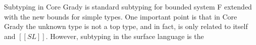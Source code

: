 Subtyping in Core Grady is standard subtyping for bounded system F
extended with the new bounds for simple types.  One important point is
that in Core Grady the unknown type is not a top type, and in fact, is
only related to itself and $[[SL]]$.  However, subtyping in the
surface language is the 


